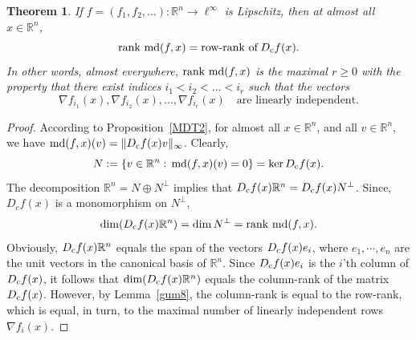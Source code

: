 \documentclass[12pt,leqno]{amsart}
\newtheorem{theorem}{Theorem}
\theoremstyle{definition}
\newcommand{\bbbn}{\mathbb N}
\newcommand{\bbbr}{\mathbb R}
\def\rank{{\rm rank\,}}
\def\md{\operatorname{md}}
\numberwithin{theorem}{section} \numberwithin{equation}{section}
\begin{document}
\begin{theorem}
\label{T13}
If $f=(f_1,f_2,\ldots)\colon \bbbr^n\to\ell^\infty$ is Lipschitz, then at almost all $x\in \bbbr^n$,
$$
\rank\md(f,x) = \operatorname{row-rank\ of} D_{\rm c}f(x).
$$
In other words, almost everywhere, $\rank\md(f,x)$ is the maximal $r\geq 0$ with the property that there exist indices $i_1<i_2<\ldots<i_r$ such that the vectors
\begin{equation*}
\nabla f_{i_1}(x),\nabla f_{i_2}(x),\ldots,\nabla f_{i_r}(x)
\quad
\text{are linearly independent.}
\end{equation*}
\end{theorem}
\begin{proof}
According to Proposition~\ref{MDT2}, for almost all $x\in \bbbr^n$, and all $v\in\bbbr^n$, we have
$\md(f,x)(v)=\Vert D_{\rm c}f(x)v\Vert_{\infty}$.
Clearly,
$$
N:=\{v\in\bbbr^n:\, \md(f,x)(v)=0\}=\ker D_{\rm c}f(x).
$$
The decomposition $\bbbr^n=N\oplus N^\perp$ implies that $D_{\rm c}f(x)\bbbr^n=D_{\rm c}f(x) N^\perp$. Since, $D_cf(x)$ is a monomorphism on $N^\perp$,
$$
\dim (D_{\rm c}f(x)\bbbr^n)=\dim N^\perp = \rank\md(f,x).
$$
Obviously, $D_{\rm c}f(x)\bbbr^n$ equals the span of the vectors $D_{\rm c}f(x)e_i$, where $e_1,\cdots,e_n$ are the unit vectors in the canonical basis of $\bbbr^n$. Since $D_{\rm c}f(x)e_i$ is the $i$'th column of $D_{\rm c}f(x)$, it follows that $\dim (D_{\rm c}f(x)\bbbr^n)$ equals the column-rank of the matrix $D_{\rm c}f(x)$. However, by Lemma~\ref{gum8}, the column-rank is equal to the row-rank, which is equal, in turn, to the maximal number of linearly independent rows $\nabla f_i(x)$.
\end{proof}
\end{document}
